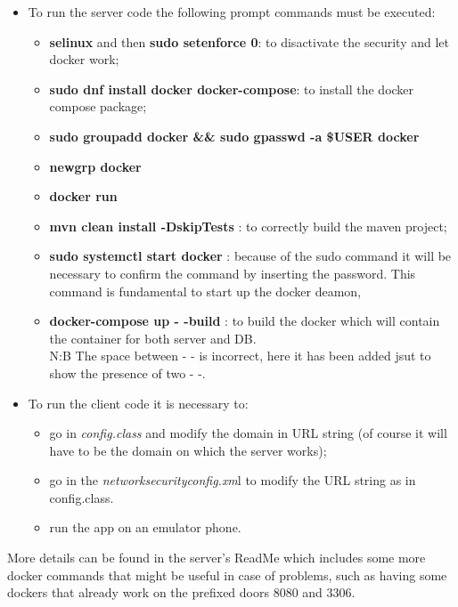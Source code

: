 \begin{itemize}
	\item To run the server code the following prompt commands must be executed:\\
		\begin{itemize}
			\item \textbf{selinux} and then \textbf{sudo setenforce 0}: to disactivate the security and let docker work;
			\item \textbf{sudo dnf install docker docker-compose}: to install the docker compose package;
			\item \textbf{sudo groupadd docker \&\& sudo gpasswd -a \${USER} docker}
			\item \textbf{newgrp docker}
			\item \textbf{docker run}
			\item \textbf{ mvn clean install -DskipTests} : to correctly build the maven project;
			\item \textbf{ sudo systemctl start docker} : because of the sudo command it will be necessary to confirm the 					command by inserting the password. This command is fundamental to start up the docker deamon,	
			\item \textbf{ docker-compose up - -build} : to build the docker which will contain the container for both server 					and DB.\\N:B The space between - - is incorrect, here it has been added jsut to show the presence of two - -.
		\end{itemize}

	\item To run the client code it is necessary to:
		\begin{itemize}
			\item go in \textit{config.class} and modify the domain in URL string (of course it will have to be the domain on 					which the server works);
			\item go in the \textit{networksecurityconfig.xm}l to modify the URL string as in config.class.
			\item run the app on an emulator phone.
		\end{itemize} 
\end{itemize}
More details can be found in the server's ReadMe which includes some more docker commands that might be useful in case of problems, such as having some dockers that already work on the prefixed doors 8080 and 3306.

